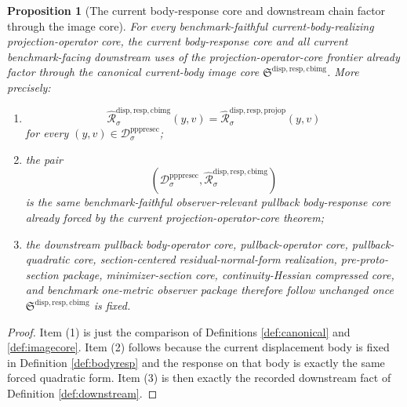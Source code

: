 \documentclass[11pt]{article}
\newcommand{\PrePreProtoSectionResidualBody}[1]{\mathcal D_{#1}^{\mathrm{pppresec}}}
\newcommand{\CurrentBodyImageCore}{\mathfrak S^{\mathrm{disp,resp,cbimg}}}
\newcommand{\CoreForcedBodyResponse}[1]{\widehat{\mathscr R}_{#1}^{\mathrm{disp,resp,projop}}}
\newcommand{\CanonicalImageResponse}[1]{\widehat{\mathscr R}_{#1}^{\mathrm{disp,resp,cbimg}}}
\newtheorem{proposition}{Proposition}
\begin{document}
\begin{proposition}[The current body-response core and downstream chain factor through the image core]
\label{prop:downstream}
For every benchmark-faithful current-body-realizing projection-operator core, the current body-response core and all current benchmark-facing downstream uses of the projection-operator-core frontier already factor through the canonical current-body image core \(\CurrentBodyImageCore\). More precisely:
\begin{enumerate}
    \item
    \[
    \CanonicalImageResponse{\sigma}(y,v)
    =
    \CoreForcedBodyResponse{\sigma}(y,v)
    \]
    for every \((y,v)\in\PrePreProtoSectionResidualBody{\sigma}\);
    \item the pair
    \[
    \left(
    \PrePreProtoSectionResidualBody{\sigma},
    \CanonicalImageResponse{\sigma}
    \right)
    \]
    is the same benchmark-faithful observer-relevant pullback body-response core already forced by the current projection-operator-core theorem;
    \item the downstream pullback body-operator core, pullback-operator core, pullback-quadratic core, section-centered residual-normal-form realization, pre-proto-section package, minimizer-section core, continuity-Hessian compressed core, and benchmark one-metric observer package therefore follow unchanged once \(\CurrentBodyImageCore\) is fixed.
\end{enumerate}
\end{proposition}

\begin{proof}
Item (1) is just the comparison of Definitions \ref{def:canonical} and \ref{def:imagecore}. Item (2) follows because the current displacement body is fixed in Definition \ref{def:bodyresp} and the response on that body is exactly the same forced quadratic form. Item (3) is then exactly the recorded downstream fact of Definition \ref{def:downstream}.
\end{proof}
\end{document}

